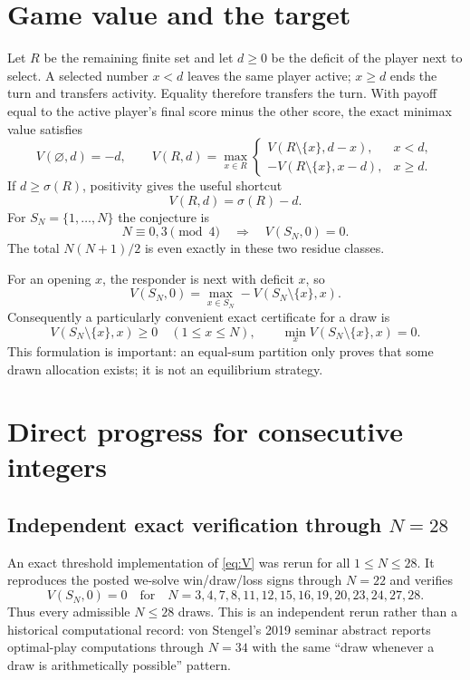 \documentclass[11pt]{article}
\theoremstyle{remark}
\newcommand{\sm}[1]{\sigma(#1)}
\begin{document}
\section{Game value and the target}
Let $R$ be the remaining finite set and let $d\ge0$ be the deficit of the
player next to select.  A selected number $x<d$ leaves the same player active;
$x\ge d$ ends the turn and transfers activity.  Equality therefore transfers
the turn.  With payoff equal to the active player's final score minus the
other score, the exact minimax value satisfies
\begin{equation}\label{eq:V}
V(\varnothing,d)=-d,\qquad
V(R,d)=\max_{x\in R}
\begin{cases}
V(R\setminus\{x\},d-x),&x<d,\\[2pt]
-V(R\setminus\{x\},x-d),&x\ge d.
\end{cases}
\end{equation}
If $d\ge\sm R$, positivity gives the useful shortcut
\begin{equation}\label{eq:terminal}
V(R,d)=\sm R-d.
\end{equation}
For $S_N=\{1,\ldots,N\}$ the conjecture is
\begin{equation}\label{eq:target}
\boxed{\quad N\equiv0,3\pmod4\quad\Longrightarrow\quad V(S_N,0)=0.\quad}
\end{equation}
The total $N(N+1)/2$ is even exactly in these two residue classes.

For an opening $x$, the responder is next with deficit $x$, so
\begin{equation}\label{eq:opening}
V(S_N,0)=\max_{x\in S_N}-V(S_N\setminus\{x\},x).
\end{equation}
Consequently a particularly convenient exact certificate for a draw is
\begin{equation}\label{eq:certificate}
V(S_N\setminus\{x\},x)\ge0\quad(1\le x\le N),
\qquad
\min_xV(S_N\setminus\{x\},x)=0.
\end{equation}
This formulation is important: an equal-sum partition only proves that some
drawn allocation exists; it is not an equilibrium strategy.

\section{Direct progress for consecutive integers}

\subsection{Independent exact verification through $N=28$}
An exact threshold implementation of \eqref{eq:V} was rerun for all
$1\le N\le28$.  It reproduces the posted we-solve win/draw/loss signs through
$N=22$ and verifies
\[
V(S_N,0)=0
\quad\text{for}\quad
N=3,4,7,8,11,12,15,16,19,20,23,24,27,28.
\]
Thus every admissible $N\le28$ draws.  This is an independent rerun rather
than a historical computational record: von Stengel's 2019 seminar abstract
reports optimal-play computations through $N=34$ with the same
``draw whenever a draw is arithmetically possible'' pattern.
\end{document}
